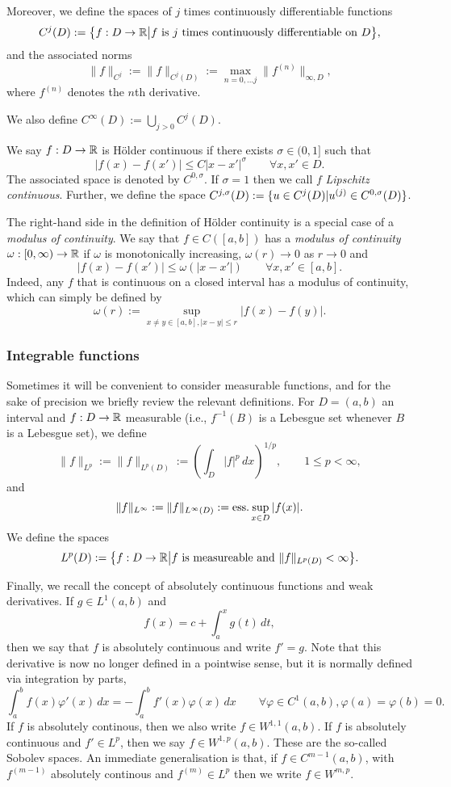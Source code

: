 Moreover, we define the spaces of $j$ times continuously differentiable functions
\[
  C^j(D) := \big\{ f : D \to \mathbb{R} \big| f \text{ is $j$ times continuously
                differentiable on } D \big\},
\]
and the associated norms
\[
   \|f \|_{C^j} :=  \|f \|_{C^j(D)} :=
    \max_{n = 0, \dots j} \| f^{(n)} \|_{\infty, D},
\]
where $f^{(n)}$ denotes the $n$th derivative.

We also define $C^\infty(D) := \bigcup_{j > 0} C^j(D)$.

We say $f : D \to \mathbb{R}$ is H\"{o}lder continuous if there exists $\sigma \in (0, 1]$
such that
\[
    |f(x) - f(x')| \leq C |x - x'|^\sigma \qquad \forall x, x' \in D.
\]
The associated space is denoted by $C^{0,\sigma}$. If $\sigma = 1$ then
we call $f$ {\em Lipschitz continuous}. Further, we define the space
$C^{j,\sigma}(D) := \{ u \in C^j(D) | u^{(j)} \in C^{0,\sigma}(D)\}$.

The right-hand side in the definition of H\"{o}lder  continuity is 
a special case of a {\em modulus of continuity}. We say that $f \in C([a,b])$ has a 
{\em modulus of continuity} $\omega : [0, \infty) \to \mathbb{R}$ if 
$\omega$ is monotonically increasing, $\omega(r) \to 0$ as $r \to 0$ and 
\[
  |f(x) - f(x')| \leq \omega(|x-x'|) \qquad \forall x, x' \in [a,b].
\]
Indeed, any $f$ that is continuous on a closed interval has a modulus of continuity, which can simply be defined by 
\[
  \omega(r) := \sup_{x \neq y \in [a, b], |x - y| \leq r} |f(x) - f(y)|.
\]

\subsubsection{Integrable functions}
%
Sometimes it will be convenient to consider measurable functions, and
for the sake of precision we briefly review the relevant definitions.
For $D = (a, b)$ an interval and $f : D \to \mathbb{R}$ measurable (i.e.,
$f^{-1}(B)$ is a Lebesgue set whenever $B$ is a Lebesgue set), we define
\[
    \| f \|_{L^p} := \|f \|_{L^p(D)} :=
      \left(\int_D |f|^p \,dx\right)^{1/p}, \qquad 1 \leq p < \infty,
\]
and
\[
    \|f\|_{L^\infty} := \|f\|_{L^\infty(D)} :=
    {\rm ess.}\sup_{x \in D} |f(x)|.
\]
We define the spaces
\[
  L^p(D) := \big\{ f : D \to \mathbb{R} \big| \text{$f$ is measureable
                  and $\|f\|_{L^p(D)} < \infty$} \big\}.
\]

Finally, we recall the concept of absolutely continuous functions and weak derivatives. 
If $g \in L^1(a,b)$ and 
\[
  f(x) = c + \int_a^x g(t) \,dt, 
\]
then we say that $f$ is absolutely continuous and write $f' = g$. Note that this derivative is now no longer defined in a pointwise sense, but it is normally defined via integration by parts, 
\[
  \int_a^b f(x) \varphi'(x) \,dx = - \int_a^b f'(x) \varphi(x) \,dx
  \qquad \forall \varphi \in C^1(a,b), \varphi(a) = \varphi(b) = 0.
\]
If $f$ is absolutely continous, then we also write $f \in W^{1,1}(a,b)$. If $f$ is absolutely continuous and $f' \in L^p$, then we say $f \in W^{1,p}(a,b)$. These are the so-called Sobolev spaces. An immediate generalisation is that, if $f \in C^{m-1}(a,b)$, with $f^{(m-1)}$ absolutely continous and $f^{(m)} \in L^p$ then we write $f \in W^{m, p}$.

